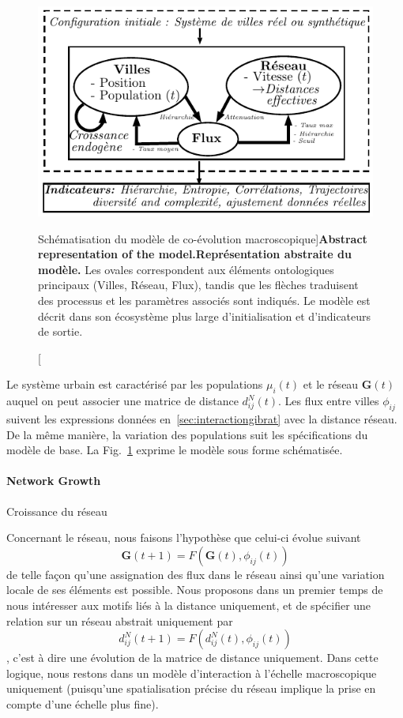 \begin{figure}
\includegraphics[width=\linewidth]{Figures/MacroCoEvol/model}
\caption[Schematic Model Representation][Schématisation du modèle de co-évolution macroscopique]{\textbf{Abstract representation of the model.}}{\textbf{Représentation abstraite du modèle.} Les ovales correspondent aux éléments ontologiques principaux (Villes, Réseau, Flux), tandis que les flèches traduisent des processus et les paramètres associés sont indiqués. Le modèle est décrit dans son écosystème plus large d'initialisation et d'indicateurs de sortie.\label{fig:macrocoevol:model}}
\end{figure}



Le système urbain est caractérisé par les populations $\mu_i(t)$ et le réseau $\mathbf{G}(t)$ auquel on peut associer une matrice de distance $d^N_{ij}(t)$. Les flux entre villes $\phi_{ij}$ suivent les expressions données en~\ref{sec:interactiongibrat} avec la distance réseau. De la même manière, la variation des populations suit les spécifications du modèle de base. La Fig.~\ref{fig:macrocoevol:model} exprime le modèle sous forme schématisée.




\paragraph{Network Growth}{Croissance du réseau}


Concernant le réseau, nous faisons l'hypothèse que celui-ci évolue suivant
\[
\mathbf{G}(t + 1) = F(\mathbf{G}(t),\phi_{ij}(t))
\]
de telle façon qu'une assignation des flux dans le réseau ainsi qu'une variation locale de ses éléments est possible. Nous proposons dans un premier temps de nous intéresser aux motifs liés à la distance uniquement, et de spécifier une relation sur un réseau abstrait uniquement par
\[
d^N_{ij}(t+1) = F(d^N_{ij}(t),\phi_{ij}(t))
\]
, c'est à dire une évolution de la matrice de distance uniquement. Dans cette logique, nous restons dans un modèle d'interaction à l'échelle macroscopique uniquement (puisqu'une spatialisation précise du réseau implique la prise en compte d'une échelle plus fine).

